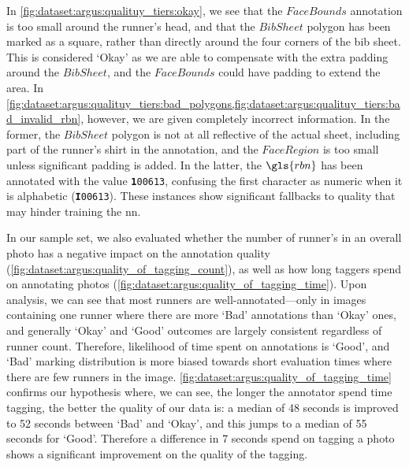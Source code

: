 In \cref{fig:dataset:argus:qualituy_tiers:okay}, we see that the $FaceBounds$ annotation is too small around the runner's head, and that the $BibSheet$ polygon has been marked as a square, rather than directly around the four corners of the bib sheet. This is considered `Okay' as we are able to compensate with the extra padding around the $BibSheet$, and the $FaceBounds$ could have padding to extend the area. In \cref{fig:dataset:argus:qualituy_tiers:bad_polygons,fig:dataset:argus:qualituy_tiers:bad_invalid_rbn}, however, we are given completely incorrect information. In the former, the $BibSheet$ polygon is not at all reflective of the actual sheet, including part of the runner's shirt in the annotation, and the $FaceRegion$ is too small unless significant padding is added. In the latter, the $\gls{rbn}$ has been annotated with the value \texttt{\textbf{1}00613}, confusing the first character as numeric when it is alphabetic (\texttt{\textbf{I}00613}). These instances show significant fallbacks to quality that may hinder training the \gls{nn}.

In our sample set, we also evaluated whether the number of runner's in an overall photo has a negative impact on the annotation quality (\cref{fig:dataset:argus:quality_of_tagging_count}), as well as how long taggers spend on annotating photos (\cref{fig:dataset:argus:quality_of_tagging_time}). Upon analysis, we can see that most runners are well-annotated---only in images containing one runner where there are more `Bad' annotations than `Okay' ones, and generally `Okay' and `Good' outcomes are largely consistent regardless of runner count. Therefore, likelihood of time spent on annotations is `Good', and `Bad' marking distribution is more biased towards short evaluation times where there are few runners in the image. \cref{fig:dataset:argus:quality_of_tagging_time} confirms our hypothesis where, we can see, the longer the annotator spend time tagging, the better the quality of our data is: a median of 48 seconds is improved to 52 seconds between `Bad' and `Okay', and this jumps to a median of 55 seconds for `Good'. Therefore a difference in 7 seconds spend on tagging a photo shows a significant improvement on the quality of the tagging.

\clearpage


